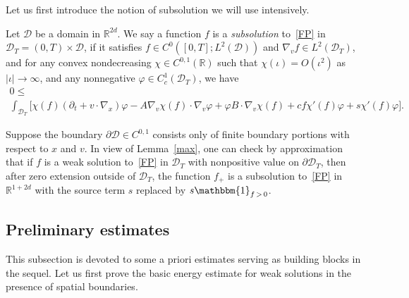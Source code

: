 \documentclass[AHL,Unicode,longabstracts,published]{cedram}
\newcommand*\p{\partial}
\newcommand*\R {\mathbb{R}}
\newcommand*\D {\mathcal{D}}
\begin{document}
Let us first introduce the notion of subsolution we will use intensively.

\begin{defi}
Let $\D$ be a domain in $\R^{2d}$. We say a function $f$ is a \emph{subsolution} to~\eqref{FP} in $\D_T=(0,T)\times\D$, if it satisfies $f\in C^0([0,T];L^2(\D))$ and $\nabla_vf\in L^2(\D_T)$, and for any convex nondecreasing $\chi\in C^{0,1}(\R)$ such that $\chi(\iota)=O(\iota^2)$ as $|\iota|\rightarrow\infty$, and any nonnegative $\varphi\in C^1_c(\D_T)$, we have
\begin{multline*}
0\le\\
\int_{\D_T} \big[\chi(f)(\p_t+v\cdot\nabla_x)\varphi -A\nabla_v\chi(f) \cdot\nabla_v\varphi
+ \varphi B\cdot\nabla_v\chi(f) + cf\chi'(f)\varphi +s\chi'(f)\varphi\big].
\end{multline*}
\end{defi}

\begin{rema}
Suppose the boundary $\p\D\in C^{0,1}$ consists only of finite boundary portions with respect to $x$ and $v$. In view of Lemma~\ref{max}, one can check by approximation that if $f$ is a weak solution to~\eqref{FP} in $\D_T$ with nonpositive value on $\p\D_T$, then after zero extension outside of $\D_T$, the function $f_+$ is a subsolution to~\eqref{FP} in $\R^{1+2d}$ with the source term $s$ replaced by $s\mathbbm{1}_{f\,>\,0}$.
\end{rema}

\subsection{Preliminary estimates}

This subsection is devoted to some a priori estimates serving as building blocks in the sequel. Let us first prove the basic energy estimate for weak solutions in the presence of spatial boundaries.
\end{document}
